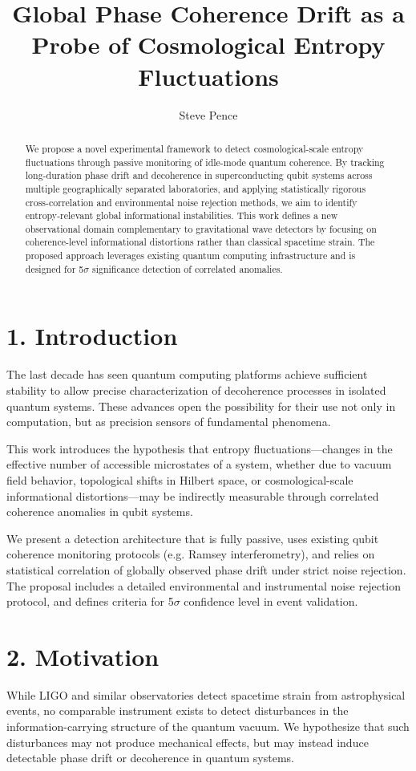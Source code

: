 \documentclass[12pt]{article}
\title{Global Phase Coherence Drift as a Probe of Cosmological Entropy Fluctuations}
\author{Steve Pence}
\affil{Entropy Wave Detection Initiative\\Spring 2025\\\texttt{entropywaves@protonmail.com}}
\date{}
\begin{document}
\maketitle

\begin{abstract}
We propose a novel experimental framework to detect cosmological-scale entropy fluctuations through passive monitoring of idle-mode quantum coherence. By tracking long-duration phase drift and decoherence in superconducting qubit systems across multiple geographically separated laboratories, and applying statistically rigorous cross-correlation and environmental noise rejection methods, we aim to identify entropy-relevant global informational instabilities. This work defines a new observational domain complementary to gravitational wave detectors by focusing on coherence-level informational distortions rather than classical spacetime strain. The proposed approach leverages existing quantum computing infrastructure and is designed for 5$\sigma$ significance detection of correlated anomalies.
\end{abstract}

\section*{1. Introduction}
The last decade has seen quantum computing platforms achieve sufficient stability to allow precise characterization of decoherence processes in isolated quantum systems. These advances open the possibility for their use not only in computation, but as precision sensors of fundamental phenomena.

This work introduces the hypothesis that entropy fluctuations---changes in the effective number of accessible microstates of a system, whether due to vacuum field behavior, topological shifts in Hilbert space, or cosmological-scale informational distortions---may be indirectly measurable through correlated coherence anomalies in qubit systems.

We present a detection architecture that is fully passive, uses existing qubit coherence monitoring protocols (e.g. Ramsey interferometry), and relies on statistical correlation of globally observed phase drift under strict noise rejection. The proposal includes a detailed environmental and instrumental noise rejection protocol, and defines criteria for 5$\sigma$ confidence level in event validation.

\section*{2. Motivation}
While LIGO and similar observatories detect spacetime strain from astrophysical events, no comparable instrument exists to detect disturbances in the information-carrying structure of the quantum vacuum. We hypothesize that such disturbances may not produce mechanical effects, but may instead induce detectable phase drift or decoherence in quantum systems. 
\end{document}
